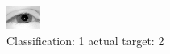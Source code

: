 \begin{figure}[h!]
\begin{center}
\includegraphics[width=0.60\columnwidth]{figures/ID2255_class_1_target_2.png}
\end{center}
\caption{ Classification: 1 actual target: 2}
\label{fig:ID2255_class_1_target_2}
\end{figure}
